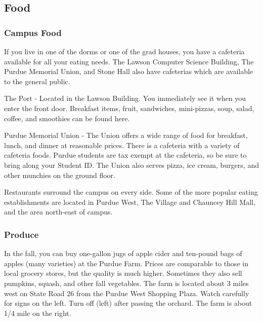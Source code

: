\subsection{Food}


\subsubsection{Campus Food}
If you live in one of the dorms or one of the grad houses, you have a cafeteria available for all your eating needs. The Lawson Computer Science Building, The Purdue Memorial Union, and Stone Hall also have cafeterias which are available to the general public.

The Port - Located in the Lawson Building. You immediately see it when you enter the front door. Breakfast items, fruit, sandwiches, mini-pizzas, soup, salad, coffee, and smoothies can be found here.

Purdue Memorial Union - The Union offers a wide range of food for breakfast, lunch, and dinner at reasonable prices. There is a cafeteria with a variety of cafeteria foods. Purdue students are tax exempt at the cafeteria, so be sure to bring along your Student ID. The Union also serves pizza, ice cream, burgers, and other munchies on the ground floor.

Restaurants surround the campus on every side. Some of the more popular eating establishments are located in Purdue West, The Village and Chauncey Hill Mall, and the area north-east of campus.


\subsubsection{Produce}
In the fall, you can buy one-gallon jugs of apple cider and ten-pound bags of apples (many varieties) at the Purdue Farm. Prices are comparable to those in local grocery stores, but the quality is much higher. Sometimes they also sell pumpkins, squash, and other fall vegetables. The farm is located about 3 miles west on State Road 26 from the Purdue West Shopping Plaza. Watch carefully for signs on the left. Turn off (left) after passing the orchard. The farm is about 1/4 mile on the right.



